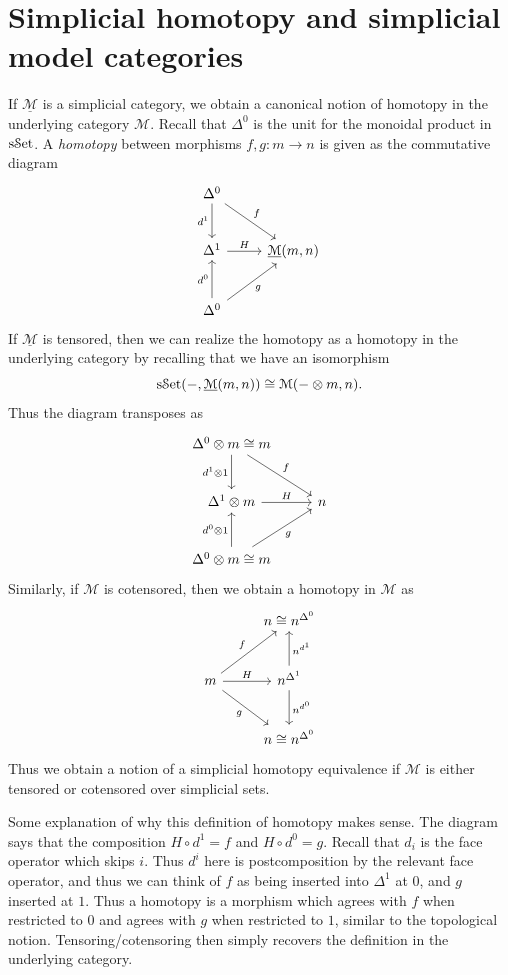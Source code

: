 \section{Simplicial homotopy and simplicial model categories}

If $\underline{\mathcal{M} } $ is a simplicial category, we obtain a canonical notion of homotopy in the underlying category $\mathcal{M} $. Recall that $\Delta^0$ is the unit for the monoidal product in $\mathrm{s}\mathcal{S}\mathrm{et}$. A \emph{homotopy} between morphisms $f,g : m \to n$ is given as the commutative diagram
\[\begin{tikzcd}[row sep = 2.5em, column sep = 2.5em]
\Delta^0\ar[" f ", dr]\ar[" d^1 "', d]  &  \\
\Delta^1 \ar[" H ", r]  & \underline{\mathcal{M} } (m,n) \\
\Delta^0\ar[" d^0 ", u] \ar[" g "', ur]  & 
\end{tikzcd}\]
If $\underline{\mathcal{M} } $ is tensored, then we can realize the homotopy as a homotopy in the underlying category by recalling that we have an isomorphism
\[
	\mathrm{s}\mathcal{S}\mathrm{et}(-,\underline{\mathcal{M} } (m,n))\cong \mathcal{M} (-\otimes m,n)
.\]
Thus the diagram transposes as
\[\begin{tikzcd}[row sep = 2.5em, column sep = 2.5em]
\Delta^0 \otimes m\cong m\ar[" f ", dr] \ar[" d^1\otimes 1 "', d]  &  \\
\Delta^1\otimes m\ar[" H ", r]  & n \\
\Delta^0\otimes m\cong m \ar[" d^0 \otimes 1 ", u] \ar[" g "', ur]  & 
\end{tikzcd}\]
Similarly, if $\mathcal{M} $ is cotensored, then we obtain a homotopy in $\mathcal{M} $ as
\[\begin{tikzcd}[row sep = 2.5em, column sep = 2.5em]
 & n\cong n^{\Delta^0}  \\
m\ar[" f ", ur] \ar[" H ", r] \ar[" g "', dr]  & n^{\Delta^1} \ar[" n^{d^1}  "', u] \ar[" n^{d^0}  ", d]  \\
 & n\cong n^{\Delta^0} 
\end{tikzcd}\]
Thus we obtain a notion of a simplicial homotopy equivalence if $\mathcal{M}$ is either tensored or cotensored over simplicial sets.

\begin{remark}
	Some explanation of why this definition of homotopy makes sense. The diagram says that the composition $H\circ d^1=f$ and $H\circ d^0=g$. Recall that $d_i$ is the face operator which skips $i$. Thus $d^i$ here is postcomposition by the relevant face operator, and thus we can think of $f$ as being inserted into $\Delta^1$ at $0$, and $g$ inserted at $1$. Thus a homotopy is a morphism which agrees with $f$ when restricted to $0$ and agrees with $g$ when restricted to $1$, similar to the topological notion. Tensoring/cotensoring then simply recovers the definition in the underlying category.
\end{remark}

